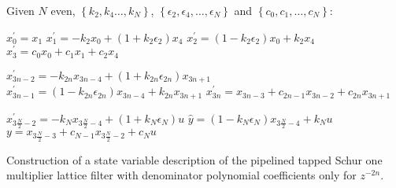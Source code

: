 \documentclass[a4paper,twoside,10pt,english]{article}
\begin{document}
\begin{algorithm}
Given $N$ even, $\left\{k_{2},k_{4}\hdots,k_{N}\right\}$,
$\left\{\epsilon_{2},\epsilon_{4},\hdots,\epsilon_{N}\right\}$ and
$\left\{c_{0},c_{1},\hdots,c_{N}\right\}$:
\begin{algorithmic}
\State $x^{\prime}_{0}=x_{1}$
\State $x^{\prime}_{1}=-k_{2}x_{0}+\left(1+k_{2}\epsilon_{2}\right)x_{4}$
\State $x^{\prime}_{2}=\left(1-k_{2}\epsilon_{2}\right)x_{0}+k_{2}x_{4}$
\State $x^{\prime}_{3}=c_{0}x_{0}+c_{1}x_{1}+c_{2}x_{4}$

\State $x^{\prime}_{3n-2}=-k_{2n}x_{3n-4}+\left(1+k_{2n}\epsilon_{2n}\right)x_{3n+1}$
\State $x^{\prime}_{3n-1}=\left(1-k_{2n}\epsilon_{2n}\right)x_{3n-4}+ k_{2n}x_{3n+1}$
\State $x^{\prime}_{3n}=x_{3n-3}+c_{2n-1}x_{3n-2}+c_{2n}x_{3n+1}$
\EndFor

\State $x_{3\frac{N}{2}-2}^{\prime} = -k_{N}x_{3\frac{N}{2}-4}+
\left(1+k_{N}\epsilon_{N}\right)u$
\State $\hat{y} = \left(1-k_{N}\epsilon_{N}\right)x_{3\frac{N}{2}-4}+k_{N}u$
\State $y = x_{3\frac{N}{2}-3}+c_{N-1}x_{3\frac{N}{2}-2}+c_{N}u$
\end{algorithmic}
\caption{Construction of a state variable description of the pipelined tapped
  Schur one multiplier lattice filter with denominator polynomial coefficients
  only for $z^{-2n}$.}
\label{alg:State-variable-pipelined-One-Multiplier-R2-lattice}
\end{algorithm}
\end{document}
